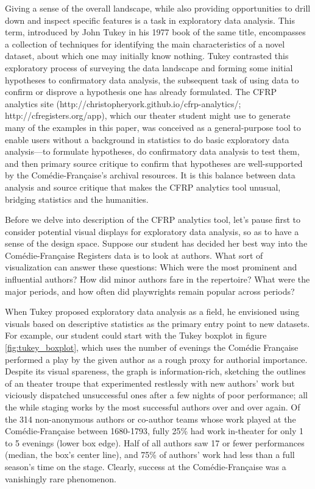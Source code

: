 \documentclass[	DIV=calc,%
							paper=a4,%
							fontsize=11pt,%
							twocolumn]{scrartcl}	 					%
\begin{document}
Giving a sense of the overall landscape, while also providing opportunities to drill down and inspect specific features is a task in exploratory data analysis. This term, introduced by John Tukey in his 1977 book of the same title, encompasses a collection of techniques for identifying the main characteristics of a novel dataset, about which one may initially know nothing.  Tukey contrasted this exploratory process of surveying the data landscape and forming some initial hypotheses to confirmatory data analysis, the subsequent task of using data to confirm or disprove a hypothesis one has already formulated.\cite{TUKEY:1977}  The CFRP analytics site (http://christopheryork.github.io/cfrp-analytics/; http://cfregisters.org/app), which our theater student might use to generate many of the examples in this paper, was conceived as a general-purpose tool to enable users without a background in statistics to do basic exploratory data analysis—to formulate hypotheses, do confirmatory data analysis to test them, and then primary source critique to confirm that hypotheses are well-supported by the Comédie-Française’s archival resources.  It is this balance between data analysis and source critique that makes the CFRP analytics tool unusual, bridging statistics and the humanities.

Before we delve into description of the CFRP analytics tool, let’s pause first to consider potential visual displays for exploratory data analysis, so as to have a sense of the design space. Suppose our student has decided her best way into the Comédie-Française Registers data is to look at authors.  What sort of visualization can answer these questions: Which were the most prominent and influential authors?  How did minor authors fare in the repertoire?  What were the major periods, and how often did playwrights remain popular across periods?

When Tukey proposed exploratory data analysis as a field, he envisioned using visuals based on descriptive statistics as the primary entry point to new datasets.  For example, our student could start with the Tukey boxplot in figure \ref{fig:tukey_boxplot}, which uses the number of evenings the Comédie Française performed a play by the given author as a rough proxy for authorial importance.  Despite its visual spareness, the graph is information-rich, sketching the outlines of an theater troupe that experimented restlessly with new authors’ work but viciously dispatched unsuccessful ones after a few nights of poor performance; all the while staging works by the most successful authors over and over again. Of the 314 non-anonymous authors or co-author teams whose work played at the Comédie-Française between 1680-1793, fully 25\% had work in-theater for only 1 to 5 evenings (lower box edge).  Half of all authors saw 17 or fewer performances (median, the box’s center line), and 75\% of authors’ work had less than a full season’s time on the stage.  Clearly, success at the Comédie-Française was a vanishingly rare phenomenon.
\end{document}

